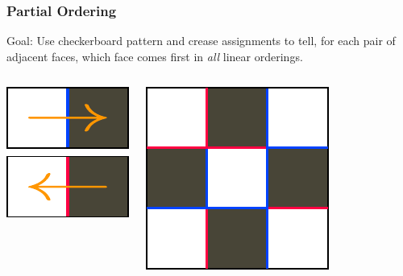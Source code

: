 \documentclass{beamer}
\begin{document}
\begin{frame}
\frametitle{Partial Ordering}
\begin{block}{Goal:}
Use checkerboard pattern and crease assignments to tell, for each pair of adjacent faces, which face comes first in \textit{all} linear orderings.
\end{block}

\bigskip

\begin{columns}[c]

\includegraphics[width=.8\textwidth]{sam_images/checkerboard-tiles.pdf}

\pause

\includegraphics[width=\textwidth]{sam_images/cp-w-cboard.pdf}

\end{columns}

\end{frame}
\end{document}
